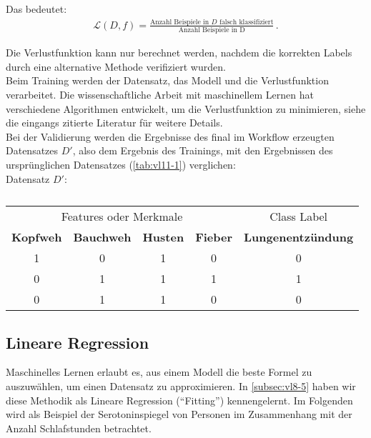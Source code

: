 Das bedeutet:
\begin{align}
\mathcal{L}(D,f) = \frac{\text{Anzahl Beispiele in $D$ falsch klassifiziert}}{\text{Anzahl Beispiele in D}}\,.
\label{eq:vl11-2}
\end{align}


Die Verlustfunktion kann nur berechnet werden, nachdem die korrekten Labels durch eine alternative Methode verifiziert wurden.\\[0.3cm]
Beim Training werden der Datensatz, das Modell und die Verlustfunktion verarbeitet. Die wissenschaftliche Arbeit mit maschinellem Lernen hat verschiedene Algorithmen entwickelt, um die Verlustfunktion zu minimieren, siehe die eingangs zitierte Literatur f\"ur weitere Details.\\[0.3cm]
Bei der Validierung werden die Ergebnisse des final im Workflow erzeugten Datensatzes $D'$, also dem Ergebnis des Trainings, mit den Ergebnissen des urspr\"unglichen Datensatzes (\cref{tab:vl11-1}) verglichen:\\[0.3cm]
Datensatz $D'$:
\begin{table}[h]
\centering
\begin{tabular}{c|c|c|c||c}
\multicolumn{4}{c}{Features oder Merkmale} & Class Label                                                \\ 
\textbf{Kopfweh} & \textbf{Bauchweh} & \textbf{Husten} & \textbf{Fieber} & \textbf{Lungenentz\"undung}  \\ \hline
1                & 0                 & 1               & 0               & 0                            \\
0                & 1                 & 1               & 1               & 1                            \\
0                & 1                 & 1               & 0               & 0                            
\end{tabular}
\caption{}
\label{tab:vl11-2}
\end{table}


\subsection{Lineare Regression}
\label{subsec:vl11-8}

Maschinelles Lernen erlaubt es, aus einem Modell die beste Formel zu auszuwählen, um einen Datensatz zu approximieren. In \cref{subsec:vl8-5} haben wir diese Methodik als Lineare Regression (``Fitting'') kennengelernt. Im Folgenden wird als Beispiel der Serotoninspiegel von Personen im Zusammenhang mit der Anzahl Schlafstunden betrachtet.

